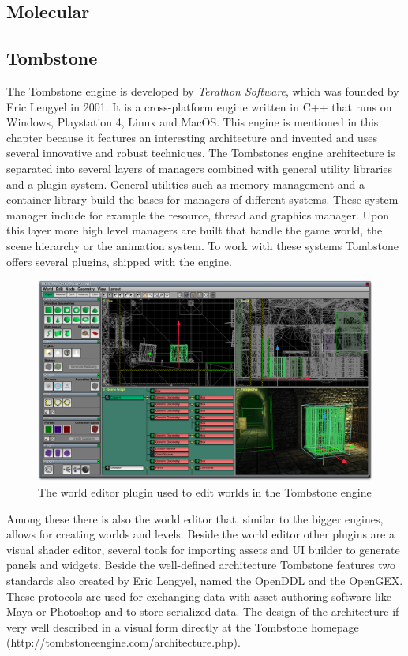 \subsection{Molecular}
\blindtext

\subsection{Tombstone}

The Tombstone engine is developed by \textit{Terathon Software}, which was founded by Eric Lengyel in 2001. It is a cross-platform engine written in C++ that runs on Windows, Playstation 4, Linux and MacOS. This engine is mentioned in this chapter because it features an interesting architecture and invented and uses several innovative and robust techniques.
The Tombstones engine architecture is separated into several layers of managers combined with general utility libraries and a plugin system. General utilities such as memory management and a container library build the bases for managers of different systems. These system manager include for example the resource, thread and graphics manager. Upon this layer more high level managers are built that handle the game world, the scene hierarchy or the animation system. To work with these systems Tombstone offers several plugins, shipped with the engine.

 \begin{figure}[h!]
 	\centering \includegraphics[width=0.5 \linewidth]{PICs/tombstone_ed.png}
 	\caption{The world editor plugin used to edit worlds in the Tombstone engine}
 	\label{fig:tombstone_ed}
 \end{figure}

Among these there is also the world editor that, similar to the bigger engines, allows for creating worlds and levels. Beside the world editor other plugins are a visual shader editor, several tools for importing assets and \ac{UI} builder to generate panels and widgets. Beside the well-defined architecture Tombstone features two standards also created by Eric Lengyel, named the \ac{OpenDDL} and the \ac{OpenGEX}. These protocols are used for exchanging data with asset authoring software like Maya or Photoshop and to store serialized data. The design of the architecture if very well described in a visual form directly at the Tombstone homepage (http://tombstoneengine.com/architecture.php).

